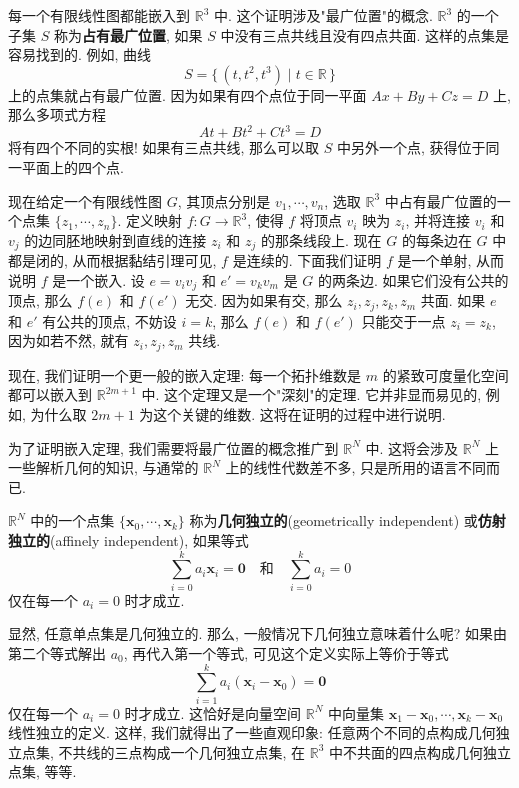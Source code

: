\begin{example}
\label{example:ch08-sec50-7}
每一个有限线性图都能嵌入到 $\mathbb{R}^{3}$ 中. 这个证明涉及"最广位置"的概念. $\mathbb{R}^{3}$ 的一个子集 $S$ 称为\textbf{占有最广位置}, 如果 $S$ 中没有三点共线且没有四点共面. 这样的点集是容易找到的. 例如, 曲线
\[
S=\{\,(t,t^{2},t^{3})\mid t\in\mathbb{R}\,\}
\]
上的点集就占有最广位置. 因为如果有四个点位于同一平面 $Ax+By+Cz=D$ 上, 那么多项式方程
\[
At+Bt^{2}+Ct^{3}=D
\]
将有四个不同的实根! 如果有三点共线, 那么可以取 $S$ 中另外一个点, 获得位于同一平面上的四个点.

现在给定一个有限线性图 $G$, 其顶点分别是 $v_1,\cdots,v_n$, 选取 $\mathbb{R}^{3}$ 中占有最广位置的一个点集 $\{z_1,\cdots,z_n\}$. 定义映射 $f\colon G\to\mathbb{R}^{3}$, 使得 $f$ 将顶点 $v_i$ 映为 $z_i$, 并将连接 $v_i$ 和 $v_j$ 的边同胚地映射到直线的连接 $z_i$ 和 $z_j$ 的那条线段上. 现在 $G$ 的每条边在 $G$ 中都是闭的, 从而根据黏结引理可见, $f$ 是连续的. 下面我们证明 $f$ 是一个单射, 从而说明 $f$ 是一个嵌入. 设 $e=v_iv_j$ 和 $e'=v_kv_m$ 是 $G$ 的两条边. 如果它们没有公共的顶点, 那么 $f(e)$ 和 $f(e')$ 无交. 因为如果有交, 那么 $z_i,z_j,z_k,z_m$ 共面. 如果 $e$ 和 $e'$ 有公共的顶点, 不妨设 $i=k$, 那么 $f(e)$ 和 $f(e')$ 只能交于一点 $z_i=z_k$, 因为如若不然, 就有 $z_i,z_j,z_m$ 共线.
\end{example}

现在, 我们证明一个更一般的嵌入定理: 每一个拓扑维数是 $m$ 的紧致可度量化空间都可以嵌入到 $\mathbb{R}^{2m+1}$ 中. 这个定理又是一个"深刻"的定理. 它并非显而易见的, 例如, 为什么取 $2m+1$ 为这个关键的维数. 这将在证明的过程中进行说明.

为了证明嵌入定理, 我们需要将最广位置的概念推广到 $\mathbb{R}^{N}$ 中. 这将会涉及 $\mathbb{R}^{N}$ 上一些解析几何的知识, 与通常的 $\mathbb{R}^{N}$ 上的线性代数差不多, 只是所用的语言不同而已.

\begin{definition}[几何独立]
\label{definition:ch08-sec50-geom-indep}
$\mathbb{R}^{N}$ 中的一个点集 $\{\boldsymbol{x}_{0},\cdots,\boldsymbol{x}_{k}\}$ 称为\textbf{几何独立的}(geometrically independent) 或\textbf{仿射独立的}(affinely independent), 如果等式
\[
\sum_{i=0}^{k}a_{i}\boldsymbol{x}_{i}=\boldsymbol{0}\quad\text{和}\quad\sum_{i=0}^{k}a_{i}=0
\]
仅在每一个 $a_i=0$ 时才成立.
\end{definition}

显然, 任意单点集是几何独立的. 那么, 一般情况下几何独立意味着什么呢? 如果由第二个等式解出 $a_0$, 再代入第一个等式, 可见这个定义实际上等价于等式
\[
\sum_{i=1}^{k}a_{i}(\boldsymbol{x}_{i}-\boldsymbol{x}_{0})=\boldsymbol{0}
\]
仅在每一个 $a_i=0$ 时才成立. 这恰好是向量空间 $\mathbb{R}^{N}$ 中向量集 $\boldsymbol{x}_1-\boldsymbol{x}_0,\cdots,\boldsymbol{x}_k-\boldsymbol{x}_0$ 线性独立的定义. 这样, 我们就得出了一些直观印象: 任意两个不同的点构成几何独立点集, 不共线的三点构成一个几何独立点集, 在 $\mathbb{R}^{3}$ 中不共面的四点构成几何独立点集, 等等.

